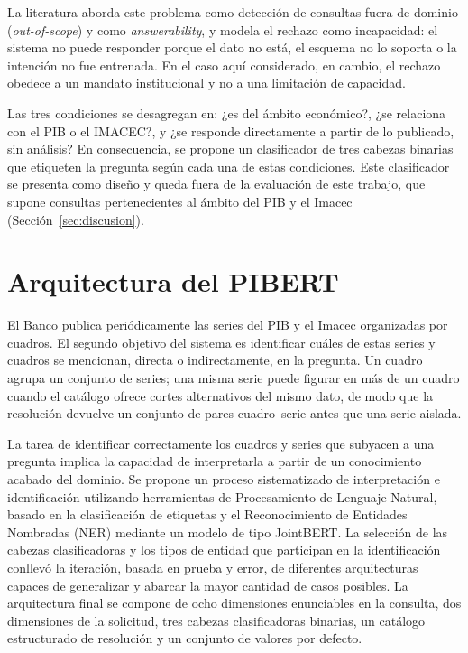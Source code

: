 \documentclass[11pt]{article}
\begin{document}
La literatura aborda este problema como detección de consultas fuera de dominio
(\textit{out-of-scope}) y como \textit{answerability}, y modela el rechazo como
incapacidad: el sistema no puede responder porque el dato no está, el esquema no lo
soporta o la intención no fue entrenada. En el caso aquí considerado, en cambio, el
rechazo obedece a un mandato institucional y no a una limitación de capacidad.

Las tres condiciones se desagregan en: ¿es del ámbito económico?, ¿se relaciona con
el PIB o el IMACEC?, y ¿se responde directamente a partir de lo publicado, sin
análisis? En consecuencia, se propone un clasificador de tres cabezas binarias que
etiqueten la pregunta según cada una de estas condiciones. Este clasificador se
presenta como diseño y queda fuera de la evaluación de este trabajo, que supone
consultas pertenecientes al ámbito del PIB y el Imacec
(Sección~\ref{sec:discusion}).

\section{Arquitectura del PIBERT}
\label{sec:pibert}

El Banco publica periódicamente las series del PIB y el Imacec organizadas por
cuadros. El segundo objetivo del sistema es identificar cuáles de estas series y
cuadros se mencionan, directa o indirectamente, en la pregunta. Un cuadro agrupa
un conjunto de series; una misma serie puede figurar en más de un cuadro cuando
el catálogo ofrece cortes alternativos del mismo dato, de modo que la resolución
devuelve un conjunto de pares cuadro--serie antes que una serie aislada.

La tarea de identificar correctamente los cuadros y series que subyacen a una
pregunta implica la capacidad de interpretarla a partir de un conocimiento
acabado del dominio. Se propone un proceso sistematizado de interpretación e
identificación utilizando herramientas de Procesamiento de Lenguaje Natural,
basado en la clasificación de etiquetas y el Reconocimiento de Entidades
Nombradas (NER) mediante un modelo de tipo JointBERT. La selección de las cabezas
clasificadoras y los tipos de entidad que participan en la identificación
conllevó la iteración, basada en prueba y error, de diferentes arquitecturas
capaces de generalizar y abarcar la mayor cantidad de casos posibles. La
arquitectura final se compone de ocho dimensiones enunciables en la consulta, dos
dimensiones de la solicitud, tres cabezas clasificadoras binarias, un catálogo
estructurado de resolución y un conjunto de valores por defecto.
\end{document}
